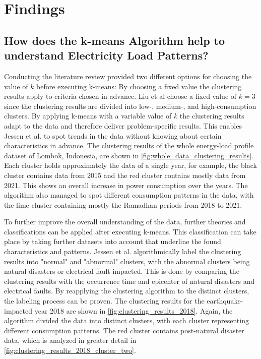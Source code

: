\chapter{Findings}
\label{cha:findings}


\section{How does the k-means Algorithm help to understand Electricity Load Patterns?}
\label{sec:findings_understand_electricity_load_patterns}
Conducting the literature review provided two different options for choosing the value of $k$ before executing k-means:
By choosing a fixed value the clustering results apply to criteria chosen in advance.
Liu et al \cite{LIU-BDE} choose a fixed value of $k=3$ since the clustering results are divided into low-, medium-, and high-consumption clusters.
By applying k-means with a variable value of $k$ the clustering results adapt to the data and therefore deliver problem-specific results.
This enables Jessen et al. \cite{JES-IND} to spot trends in the data without knowing about certain characteristics in advance.
The clustering results of the whole energy-load profile dataset of Lombok, Indonesia, are shown in \autoref{fig:whole_data_clustering_results}.
Each cluster holds approximately the data of a single year, for example, the black cluster contains data from 2015 and the red cluster contains mostly data from 2021.
This shows an overall increase in power consumption over the years.
The algorithm also managed to spot different consumption patterns in the data, with the lime cluster containing mostly the Ramadhan periods from 2018 to 2021.

To further improve the overall understanding of the data, further theories and classifications can be applied after executing k-means.
This classification can take place by taking further datasets into account that underline the found characteristics and patterns.
Jessen et al. \cite{JES-IND} algorithmically label the clustering results into "normal" and "abnormal" clusters, with the abnormal clusters being natural disasters or electrical fault impacted.
This is done by comparing the clustering results with the occurrence time and epicenter of natural disasters and electrical faults.
By reapplying the clustering algorithm to the distinct clusters, the labeling process can be proven.
The clustering results for the earthquake-impacted year 2018 are shown in \autoref{fig:clustering_results_2018}.
Again, the algorithm divided the data into distinct clusters, with each cluster representing different consumption patterns.
The red cluster contains post-natural disaster data, which is analyzed in greater detail in \autoref{fig:clustering_results_2018_cluster_two}.

